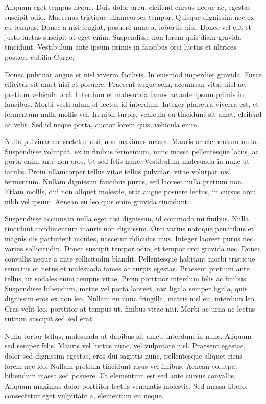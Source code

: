 Aliquam eget tempus neque. Duis dolor arcu, eleifend cursus neque ac, egestas suscipit odio. Maecenas tristique ullamcorper tempor. Quisque dignissim nec ex eu tempus. Donec a nisi feugiat, posuere nunc a, lobortis nisl. Donec vel elit et justo luctus suscipit at eget enim. Suspendisse non lorem quis diam gravida tincidunt. Vestibulum ante ipsum primis in faucibus orci luctus et ultrices posuere cubilia Curae;

Donec pulvinar augue et nisl viverra facilisis. In euismod imperdiet gravida. Fusce efficitur sit amet nisi et posuere. Praesent augue sem, accumsan vitae nisl ac, pretium vehicula orci. Interdum et malesuada fames ac ante ipsum primis in faucibus. Morbi vestibulum et lectus id interdum. Integer pharetra viverra est, et fermentum nulla mollis vel. In nibh turpis, vehicula eu tincidunt sit amet, eleifend ac velit. Sed id neque porta, auctor lorem quis, vehicula enim.

Nulla pulvinar consectetur dui, non maximus massa. Mauris ac elementum nulla. Suspendisse volutpat, ex in finibus fermentum, nunc massa pellentesque lacus, ac porta enim ante non eros. Ut sed felis nunc. Vestibulum malesuada in nunc ut iaculis. Proin ullamcorper tellus vitae tellus pulvinar, vitae volutpat nisl fermentum. Nullam dignissim faucibus purus, sed laoreet nulla pretium non. Etiam mollis, dui non aliquet molestie, erat augue posuere lectus, in cursus arcu nibh vel ipsum. Aenean eu leo quis enim gravida tincidunt.

Suspendisse accumsan nulla eget nisi dignissim, id commodo mi finibus. Nulla tincidunt condimentum mauris non dignissim. Orci varius natoque penatibus et magnis dis parturient montes, nascetur ridiculus mus. Integer laoreet purus nec varius sollicitudin. Donec suscipit tempor odio, et tempor orci gravida nec. Donec convallis neque a ante sollicitudin blandit. Pellentesque habitant morbi tristique senectus et netus et malesuada fames ac turpis egestas. Praesent pretium ante tellus, ut sodales enim tempus vitae. Proin porttitor interdum felis ac finibus. Suspendisse bibendum, metus vel porta laoreet, nisi ligula semper ligula, quis dignissim eros ex non leo. Nullam eu nunc fringilla, mattis nisl eu, interdum leo. Cras velit leo, porttitor at tempus ut, finibus vitae nisi. Morbi ac urna ac lectus rutrum suscipit sed sed erat.

Nulla tortor tellus, malesuada ut dapibus sit amet, interdum in nunc. Aliquam sed semper felis. Mauris vel luctus nunc, vel vulputate nisl. Praesent egestas, dolor sed dignissim egestas, eros dui sagittis nunc, pellentesque aliquet risus lorem nec leo. Nullam pretium tincidunt risus vel finibus. Aenean volutpat bibendum massa sed posuere. Ut elementum est sed ante cursus convallis. Aliquam maximus dolor porttitor lectus venenatis molestie. Sed massa libero, consectetur eget vulputate a, elementum eu neque.

